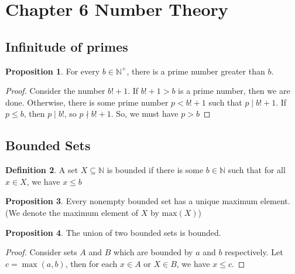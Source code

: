 \documentclass[14pt]{article}
\theoremstyle{definition}
\newtheorem{definition}{Definition}[subsection]
\newtheorem{proposition}[definition]{Proposition}
\begin{document}
\section{Chapter 6 Number Theory}
\subsection{Infinitude of primes}
\begin{proposition}
    For every $b\in \mathbb{N}^+$, there is a prime number greater than $b$.
\end{proposition}
\begin{proof}
    Consider the number $b!+1$. If $b!+1>b$ is a prime number, then we are done. Otherwise, there is some prime number $p<b!+1$ such that $p\mid b!+1$. If $p\leq b$, then $p\mid b!$, so $p\nmid b!+1 $. So, we must have $p>b$
\end{proof}

\vspace{5mm} %

\subsection{Bounded Sets}
\begin{definition}
    A set $X\subseteq\mathbb{N}$ is bounded if there is some $b\in\mathbb{N}$ such that for all $x\in X$, we have $x\leq b$
\end{definition}

\vspace{2mm} %

\begin{proposition}
    Every nonempty bounded set has a unique maximum element. (We denote the maximum element of $X$ by $\mathrm{max}(X)$)
\end{proposition}

\vspace{2mm} %

\begin{proposition}
    The union of two bounded sets is bounded.
\end{proposition}
\begin{proof}
    Consider sets $A$ and $B$ which are bounded by $a$ and $b$ respectively. Let $c=\max(a,b)$, then for each $x\in A$ or $X\in B$, we have $x\leq c$. 
\end{proof}

\vspace{5mm} %
\end{document}
